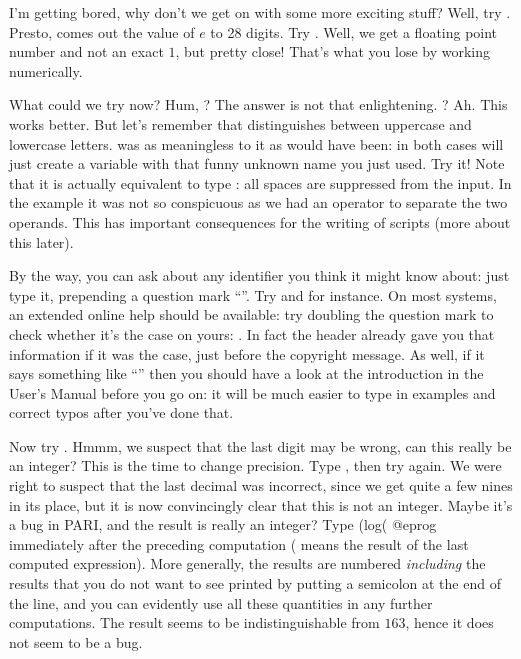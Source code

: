 I'm getting bored, why don't we get on with some more exciting stuff?  Well,
try . Presto, comes out the value of $e$ to 28 digits. Try
. Well, we get a floating point number and not an exact $1$,
but pretty close! That's what you lose by working numerically.

What could we try now? Hum, ? The answer is not that
enlightening. ? Ah. This works better. But let's remember that
 distinguishes between uppercase and lowercase letters.  was
as meaningless to it as  would have been: in both cases
 will just create a variable with that funny unknown name you just
used. Try it! Note that it is actually equivalent to type
: all spaces are suppressed from the input. In the
 example  it was not so conspicuous as we had an operator to
separate the two operands. This has important consequences for the writing of
 scripts (more about this later).

By the way, you can ask  about any identifier you think it might know
about: just type it, prepending a question mark ``''. Try 
and  for instance. On most systems, an extended online help should
be available: try doubling the question mark to check whether it's the case
on yours: . In fact the  header already gave you that
information if it was the case, just before the copyright message. As well,
if it says something like ``'' then you should have a
look at the  introduction in the User's Manual before you go
on: it will be much easier to type in examples and correct typos after you've
done that.

Now try . Hmmm, we suspect that the last digit may
be wrong, can this really be an integer? This is the time to change
precision. Type , then try  again. We
were right to suspect that the last decimal was incorrect, since we get quite
a few nines in its place, but it is now convincingly clear that this is not
an integer. Maybe it's a bug in PARI, and the result is really an integer?
Type
\bprog
  (log(%
@eprog\noindent
immediately after the preceding computation (\kbd{\%} means the result of the
last computed expression). More generally, the results are numbered  \emph{including} the results
that you do not want to see printed by putting a semicolon at the end of the
line, and you can evidently use all these quantities in any further
computations. The result seems to be indistinguishable from $163$, hence it
does not seem to be a bug.

